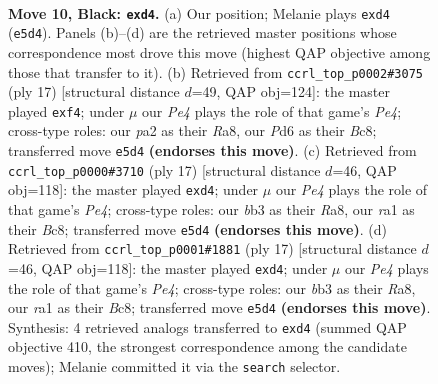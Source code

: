 \documentclass[11pt]{article}
\begin{document}
\clearpage

\begin{figure}[p]\centering
\begin{subfigure}{0.46\textwidth}\centering
\resizebox{\linewidth}{!}{%
\newchessgame
\chessboard[
  setfen={r1bq1rk1/2p1bppp/p1np1n2/4p3/1pPPP2P/1B3N2/PP3PP1/RNBQR1K1 b - c3 0 10},
  showmover=false,
  pgfstyle=straightmove, color=movearrow, markmove={e5-d4}
]}
\caption{}
\end{subfigure}\hfill
\begin{subfigure}{0.46\textwidth}\centering
\resizebox{\linewidth}{!}{%
\newchessgame
\chessboard[
  setfen={r1bq1rk1/1pp1b1pp/2np1n2/p3pp2/4PP2/2NP1NP1/PPP3BP/R1BQ1R1K b - - 4 9},
  showmover=false,
  pgfstyle=straightmove, color=movearrow, markmove={e5-f4}
]}
\caption{}
\end{subfigure}
\\[4pt]
\begin{subfigure}{0.46\textwidth}\centering
\resizebox{\linewidth}{!}{%
\newchessgame
\chessboard[
  setfen={r1bq1rk1/2p1bppp/p1np1n2/1p2p3/3PP3/1BP2N1P/PP3PP1/RNBQ1RK1 b - - 0 9},
  showmover=false,
  pgfstyle=straightmove, color=movearrow, markmove={e5-d4}
]}
\caption{}
\end{subfigure}\hfill
\begin{subfigure}{0.46\textwidth}\centering
\resizebox{\linewidth}{!}{%
\newchessgame
\chessboard[
  setfen={r1bq1rk1/2p1bppp/p1np1n2/1p2p3/3PP3/1BP2N1P/PP3PP1/RNBQ1RK1 b - - 0 9},
  showmover=false,
  pgfstyle=straightmove, color=movearrow, markmove={e5-d4}
]}
\caption{}
\end{subfigure}
\caption{\textbf{Move 10, Black: \texttt{exd4}.} (a) Our position; Melanie plays \texttt{exd4} (\texttt{e5d4}). Panels (b)--(d) are the retrieved master positions whose correspondence most drove this move (highest QAP objective among those that transfer to it). (b) Retrieved from \texttt{ccrl\_top\_p0002\#3075} (ply 17) [structural distance $d$=49, QAP obj=124]: the master played \texttt{exf4}; under $\mu$ our \emph{Pe4} plays the role of that game's \emph{Pe4}; cross-type roles: our \emph{p}a2 as their \emph{R}a8, our \emph{P}d6 as their \emph{B}c8; transferred move \texttt{e5d4} \textbf{(endorses this move)}. (c) Retrieved from \texttt{ccrl\_top\_p0000\#3710} (ply 17) [structural distance $d$=46, QAP obj=118]: the master played \texttt{exd4}; under $\mu$ our \emph{Pe4} plays the role of that game's \emph{Pe4}; cross-type roles: our \emph{b}b3 as their \emph{R}a8, our \emph{r}a1 as their \emph{B}c8; transferred move \texttt{e5d4} \textbf{(endorses this move)}. (d) Retrieved from \texttt{ccrl\_top\_p0001\#1881} (ply 17) [structural distance $d$=46, QAP obj=118]: the master played \texttt{exd4}; under $\mu$ our \emph{Pe4} plays the role of that game's \emph{Pe4}; cross-type roles: our \emph{b}b3 as their \emph{R}a8, our \emph{r}a1 as their \emph{B}c8; transferred move \texttt{e5d4} \textbf{(endorses this move)}. Synthesis: 4 retrieved analogs transferred to \texttt{exd4} (summed QAP objective 410, the strongest correspondence among the candidate moves); Melanie committed it via the \texttt{search} selector.}
\label{fig:thought-m19}
\end{figure}
\end{document}
